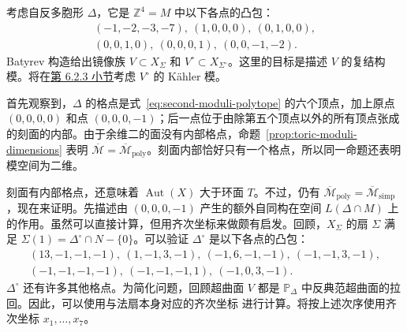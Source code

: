 \begin{example}\label{ex:degree-four-moduli}
考虑自反多胞形 $\Delta$，它是 $\mathbb Z^4=M$ 中以下各点的凸包：
\begin{equation}\label{eq:second-moduli-polytope}
\begin{gathered}
(-1,-2,-3,-7),\ (1,0,0,0),\ (0,1,0,0),\\
(0,0,1,0),\ (0,0,0,1),\ (0,0,-1,-2).
\end{gathered}
\end{equation}
Batyrev 构造给出镜像族 $V\subset X_\Sigma$ 和 $V^\circ\subset X_{\Sigma^\circ}$。这里的目标是描述 $V$ 的复结构模。将在\hyperref[subsec:enlarged-kahler-moduli]{第 6.2.3 小节}考虑 $V^\circ$ 的 Kähler 模。

首先观察到，$\Delta$ 的格点是式~\eqref{eq:second-moduli-polytope} 的六个顶点，加上原点 $(0,0,0,0)$ 和点 $(0,0,0,-1)$；后一点位于由除第五个顶点以外的所有顶点张成的刻面的内部。由于余维二的面没有内部格点，命题~\ref{prop:toric-moduli-dimensions} 表明 $\overline{\mathcal M}=\overline{\mathcal M}_{\mathrm{poly}}$。刻面内部恰好只有一个格点，所以同一命题还表明模空间为二维。

刻面有内部格点，还意味着 $\operatorname{Aut}(X)$ 大于环面 $T$。不过，仍有 $\overline{\mathcal M}_{\mathrm{poly}}=\overline{\mathcal M}_{\mathrm{simp}}$，现在来证明。先描述由 $(0,0,0,-1)$ 产生的额外自同构在空间 $L(\Delta\cap M)$ 上的作用。虽然可以直接计算，但用齐次坐标来做颇有启发。回顾，$X_\Sigma$ 的扇 $\Sigma$ 满足 $\Sigma(1)=\Delta^\circ\cap N-\{0\}$。可以验证 $\Delta^\circ$ 是以下各点的凸包：
\[
\begin{gathered}
(13,-1,-1,-1),\ (1,-1,3,-1),\ (-1,6,-1,-1),\ (-1,-1,3,-1),\\
(-1,-1,-1,-1),\ (-1,-1,-1,1),\ (-1,0,3,-1).
\end{gathered}
\]
$\Delta^\circ$ 还有许多其他格点。为简化问题，回顾超曲面 $V$ 都是 $\mathbb P_\Delta$ 中反典范超曲面的拉回。因此，可以使用与法扇本身对应的齐次坐标
进行计算。将按上述次序使用齐次坐标 $x_1,\ldots,x_7$。


\end{example}
